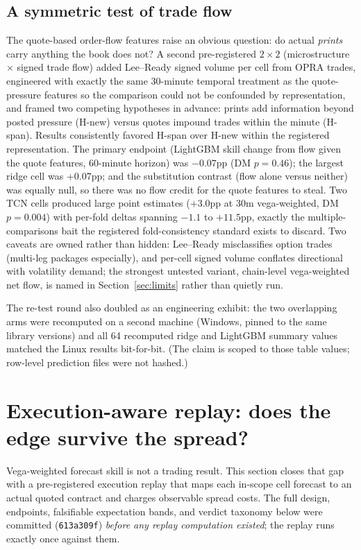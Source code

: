 \documentclass[11pt]{article}
\begin{document}
\subsection*{A symmetric test of trade flow}

The quote-based order-flow features raise an obvious question: do actual
\emph{prints} carry anything the book does not? A second pre-registered
$2\times2$ (microstructure $\times$ signed trade flow) added Lee--Ready
\cite{leeready1991} signed volume per cell from OPRA trades, engineered with
exactly the same
30-minute temporal treatment as the quote-pressure features so the
comparison could not be confounded by representation, and framed two
competing hypotheses in advance: prints add information beyond posted
pressure (H-new) versus quotes impound trades within the minute (H-span).
Results consistently favored H-span over H-new within the registered
representation. The primary endpoint (LightGBM skill change from flow given the quote features, 60-minute horizon) was $-0.07$pp
(DM $p=0.46$); the largest ridge cell was $+0.07$pp; and the substitution
contrast (flow alone versus neither) was equally null, so there was no
flow credit for the quote features to steal. Two TCN cells produced large
point estimates ($+3.0$pp at 30m vega-weighted, DM $p=0.004$) with per-fold
deltas spanning $-1.1$ to $+11.5$pp, exactly the multiple-comparisons
bait the registered fold-consistency standard exists to discard. Two
caveats are owned rather than hidden: Lee--Ready misclassifies option
trades (multi-leg packages especially), and per-cell signed volume
conflates directional with volatility demand; the strongest untested
variant, chain-level vega-weighted net flow, is named in
Section~\ref{sec:limits} rather than quietly run.

The re-test round also doubled as an engineering exhibit: the two
overlapping arms were recomputed on a second machine (Windows, pinned to
the same library versions) and all 64 recomputed ridge and LightGBM summary
values matched the Linux results bit-for-bit. (The claim is scoped to those
table values; row-level prediction files were not hashed.)

\section{Execution-aware replay: does the edge survive the spread?}
\label{sec:replay}

Vega-weighted forecast skill is not a trading result. This section closes
that gap with a pre-registered execution replay that maps each in-scope cell
forecast to an actual quoted contract and charges observable spread costs.
The full design, endpoints, falsifiable expectation bands, and verdict
taxonomy below were committed (\texttt{613a309f}) \emph{before any replay
computation existed}; the replay runs exactly once against them.
\end{document}
